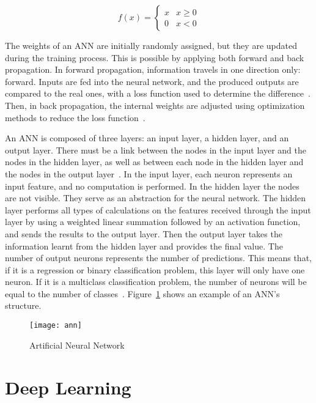 \begin{equation} \label{eq:3}
    f(x) = \begin{cases}x & x \geq 0\\0 & x < 0\end{cases}
\end{equation}

The weights of an \gls{ANN} are initially randomly assigned, but they are updated during the training process. This is possible by applying both forward and back propagation. In forward propagation, information travels in one direction only: forward. Inputs are fed into the neural network, and the produced outputs are compared to the real ones, with a loss function used to determine the difference~\cite{Farizawani2020AApproaches}. Then, in back propagation, the internal weights are adjusted using optimization methods to reduce the loss function~\cite{Kim2021CBP:Method}. 

An \gls{ANN} is composed of three layers: an input layer, a hidden layer, and an output layer. There must be a link between the nodes in the input layer and the nodes in the hidden layer, as well as between each node in the hidden layer and the nodes in the output layer~\cite{Imran2019AClassification}. In the input layer, each neuron represents an input feature, and no computation is performed. In the hidden layer the nodes are not visible. They serve as an abstraction for the neural network. The hidden layer performs all types of calculations on the features received through the input layer by using a weighted linear summation followed by an activation function, and sends the results to the output layer. Then the output layer takes the information learnt from the hidden layer and provides the final value. The number of output neurons represents the number of predictions. This means that, if it is a regression or binary classification problem, this layer will only have one neuron. If it is a multiclass classification problem, the number of neurons will be equal to the number of classes~\cite{Alaloul2020DataNetworks}. Figure~\ref{fig:ann} shows an example of an \gls{ANN}'s structure.

\begin{figure}[htbp]
    \centering
    \texttt{[image: ann]}
    \caption{Artificial Neural Network}
    \label{fig:ann}
\end{figure}

\section{Deep Learning}\label{sec:dl}

